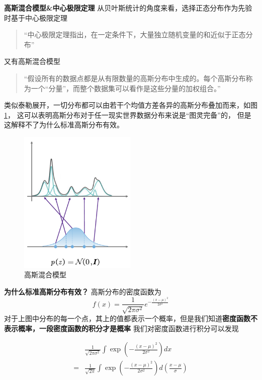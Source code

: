 \textbf{高斯混合模型\&中心极限定理}\newline
从贝叶斯统计的角度来看，选择正态分布作为先验时基于中心极限定理
\begin{quotation}
    “中心极限定理指出，在一定条件下，大量独立随机变量的和近似于正态分布”
\end{quotation}
又有高斯混合模型
\begin{quotation}
    “假设所有的数据点都是从有限数量的高斯分布中生成的。每个高斯分布称为一个“分量”，而整个数据集可以看作是这些分量的加权组合。”
\end{quotation}
类似泰勒展开，一切分布都可以由若干个均值方差各异的高斯分布叠加而来，如图\ref{fig:gmm}，
这可以表明高斯分布对于任一现实世界数据分布来说是“图灵完备”的，
但是这解释不了为什么标准高斯分布有效。
\begin{figure}[htbp]
    \centering
    \includegraphics[width=0.5\textwidth]{figures/chapter2/gmm.png}
    \caption{高斯混合模型}
    \label{fig:gmm}
\end{figure}

\textbf{为什么标准高斯分布有效？}\newline
\label{sec:why_normal_distribution}
高斯分布的密度函数为
\begin{equation}
    f(x) = \frac{1}{\sqrt{2\pi\sigma^2}}e^{-\frac{(x-\mu)^2}{2\sigma^2}}
\end{equation}
对于上图中分布的每一个点，其上的值都表示一个概率，但是我们知道\textbf{密度函数不表示概率，一段密度函数的积分才是概率}
我们对密度函数进行积分可以发现

\begin{align}
    &\frac{1}{\sqrt{2\pi\sigma^2}} \int \exp\left(-\frac{(x - \mu)^2}{2\sigma^2}\right)dx  \\
    =& \frac{1}{\sqrt{2\pi}} \int \exp\left(-\frac{(x - \mu)^2}{2\sigma^2}\right)d\left(\frac{x-\mu}{\sigma}\right)
\end{align}

